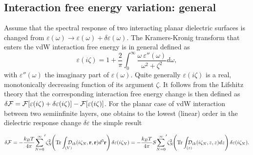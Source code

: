 \documentclass[letterpaper,twocolumn,amsmath,amssymb,floatfix,aps,superscriptaddress]{revtex4}
\begin{document}

\subsection{Interaction free energy variation: general}

Assume that the spectral response of two interacting planar dielectric surfaces is changed from  $ \varepsilon(\omega) \longrightarrow \varepsilon(\omega) + \delta \varepsilon(\omega) $. The Kramers-Kronig transform that enters the vdW interaction free energy is in general defined as 
\begin{equation}
\varepsilon(i \zeta) = 1 + \frac{2}{\pi} \int_0^{\infty} \frac{\omega ~{\varepsilon'' (\omega)}}{\omega^2 + \zeta^2}d\omega,
\label{cgsrlhjk}
\end{equation}
with $\varepsilon'' (\omega)$ the imaginary part of $ \varepsilon(\omega)$. Quite generally $\varepsilon(i \zeta)$ is a real, monotonically decreasing function of its argument $\zeta$. It follows from the Lifshitz theory \cite{LLSPpart2} that the corresponding interaction free energy change is then defined as $\delta {\cal F} = {\cal F}[\varepsilon(i \zeta) + \delta \varepsilon(i \zeta)] - {\cal F}[\varepsilon(i \zeta)]$. For the planar case of vdW interaction between two semiinfinite layers, one obtains to the lowest (linear) order in the dielectric response change $\delta \varepsilon$ the simple result \cite{LLSPpart2} 
\begin{widetext}
\begin{equation}
\delta {\cal F} = - \frac{k_BT}{4\pi} {\sum_{N=0}^{\infty}}'  \zeta_N^2\!\!\left( {\rm Tr} \int_{(V)} \!\!\!\!\!\!{\cal D}_{ik}(i \zeta_N, {\bf r}, {\bf r}) d^3{\bf r} \right) \delta \varepsilon(i \zeta_N) = - \frac{k_BT}{4\pi} S  {\sum_{N=0}^{\infty}}'  \zeta_N^2\!\!\left( {\rm Tr} \int_{(z)} \!\!\!\!\!\!{\cal D}_{ik}(i \zeta_N, z, z) d{z} \right) \delta \varepsilon(i \zeta_N).
\label{cnshirugl}
\end{equation}
\end{widetext}
\end{document}
